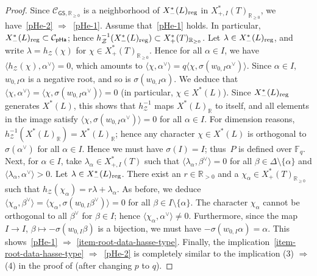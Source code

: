 \documentclass[11pt]{amsart}
\numberwithin{equation}{section}
\theoremstyle{definition}
\theoremstyle{remark}
\newcommand{\pha}{\mathsf{pHa}}
\newcommand{\GSsf}{\mathsf{GS}}
\newcommand{\Ccal}{{\mathcal C}}
\newcommand{\Zcal}{{\mathcal Z}}
\newcommand{\FF}{\mathbb{F}}
\newcommand{\RR}{\mathbb{R}}
\newcommand{\reg}{{\rm reg}}
\begin{document}
\begin{proof}
Since $\Ccal_{\GSsf,\RR_{\geq 0}}$ is a neighborhood of $X^*_{-}(L)_{\reg}$ in $X^*_{+,I}(T)_{\RR_{\geq 0}}$, we have~\eqref{pHe-2} $\Rightarrow$~\eqref{pHe-1}. Assume that~\eqref{pHe-1} holds. In particular, $X^*_{-}(L)_{\reg}\subset \Ccal_{\pha}$; hence $h_\Zcal^{-1}(X^*_{-}(L)_{\reg})\subset X^*_{+}(T)_{\RR_{\geq 0}}$. Let $\lambda\in X^*_{-}(L)_{\reg}$, and write $\lambda = h_\Zcal(\chi)$ for $\chi \in X^*_{+}(T)_{\RR_{\geq 0}}$.  Hence for all $\alpha\in I$, we have $\langle h_\Zcal(\chi),\alpha^\vee\rangle=0$, which amounts to $\langle \chi, \alpha^\vee \rangle= q\langle \chi, \sigma(w_{0,I}\alpha^\vee) \rangle$. Since $\alpha \in I$, $w_{0,I} \alpha$ is a negative root, and so is $\sigma(w_{0,I}\alpha)$. We deduce that $\langle \chi, \alpha^\vee \rangle= \langle \chi, \sigma(w_{0,I}\alpha^\vee) \rangle = 0$ (in particular, $\chi\in X^*(L)$). Since $X^*_{-}(L)_{\reg}$ generates $X^*(L)$, this shows that $h_\Zcal^{-1}$ maps $X^*(L)_\RR$ to itself, and all elements in the image satisfy $\langle \chi, \sigma(w_{0,I}\alpha^\vee) \rangle = 0$ for all $\alpha\in I$. For dimension reasons, $h^{-1}_\Zcal(X^*(L)_\RR)=X^*(L)_\RR$; hence any character $\chi \in X^*(L)$ is orthogonal to $\sigma(\alpha^\vee)$ for all $\alpha\in I$. Hence we must have $\sigma(I)=I$; thus~$P$ is defined over $\FF_q$.  Next, for $\alpha\in I$, take $\lambda_\alpha\in X_{+,I}^*(T)$ such that $\langle \lambda_\alpha , \beta^{\vee} \rangle=0$ for all $\beta \in \Delta \setminus \{\alpha\}$ and $\langle \lambda_\alpha, \alpha^\vee \rangle >0$. Let $\lambda\in X_{-}^*(L)_{\reg}$.  There exist an $r \in \mathbb{R}_{>0}$ and a $\chi_\alpha\in X_{+}^*(T)_{\mathbb{R}_{\geq 0}}$ such that $h_\Zcal(\chi_\alpha)=r\lambda+\lambda_\alpha$.  As before, we deduce $\langle \chi_\alpha, \beta^\vee \rangle = \langle \chi_\alpha, \sigma(w_{0,I}\beta^\vee) \rangle = 0$ for all $\beta\in I\setminus \{\alpha\}$. The character $\chi_\alpha$ cannot be orthogonal to all $\beta^\vee$ for $\beta\in I$; hence $\langle \chi_\alpha, \alpha^\vee \rangle \neq 0$. Furthermore, since the map $I\to I$, $\beta\mapsto -\sigma(w_{0,I}\beta)$ is a bijection, we must have $-\sigma(w_{0,I}\alpha)=\alpha$. This shows~\eqref{pHe-1} $\Rightarrow$ \eqref{item-root-data-hasse-type}. Finally, the implication~\eqref{item-root-data-hasse-type} $\Rightarrow$~\eqref{pHe-2} is completely similar to the implication (3) $\Rightarrow$ (4) in the proof of \cite[Lemma 2.3.1]{Koskivirta-automforms-GZip} (after changing $p$ to $q$).
\end{proof}
\end{document}
